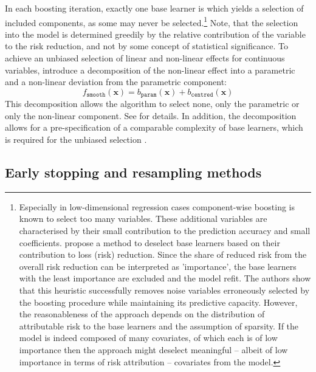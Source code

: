 In each boosting iteration, exactly one base learner is which yields a selection of included components, as some may never be selected.\footnote{Especially in low-dimensional regression cases component-wise boosting is known to select too many variables. These additional variables are characterised by their small contribution to the prediction accuracy and small coefficients. \textcite{stromerDeselectionBaselearnersStatistical2022} propose a method to deselect base learners based on their contribution to loss (risk) reduction. Since the share of reduced risk from the overall risk reduction can be interpreted as 'importance', the base learners with the least importance are excluded and the model refit. The authors show that this heuristic successfully removes noise variables erroneously selected by the boosting procedure while maintaining its predictive capacity. However, the reasonableness of the approach depends on the distribution of attributable risk to the base learners and the assumption of sparsity. If the model is indeed composed of many covariates, of which each is of low importance then the approach might deselect meaningful -- albeit of low importance in terms of risk attribution -- covariates from the model.} Note, that the selection into the model is determined greedily by the relative contribution of the variable to the risk reduction, and not by some concept of statistical significance. To achieve an unbiased selection of linear and non-linear effects for continuous variables, \textcite{kneibVariableSelectionModel2009} introduce a decomposition of the non-linear effect into a parametric and a non-linear deviation from the parametric component:
\begin{equation}
	f_{\mathtt{smooth}}(\mathbf{x}) = b_{\mathtt{param}}(\mathbf{x}) + b_{\mathtt{centred}}(\mathbf{x})
\end{equation}
This decomposition allows the algorithm to select none, only the parametric or only the non-linear component. See \textcite{kneibVariableSelectionModel2009} for details. In addition, the decomposition allows for a pre-specification of a comparable complexity of base learners, which is required for the unbiased selection \autocite{hofnerFrameworkUnbiasedModel2011}.


\subsection{Early stopping and resampling methods}\label{sec:early-stopping-and-resampling-methods}


